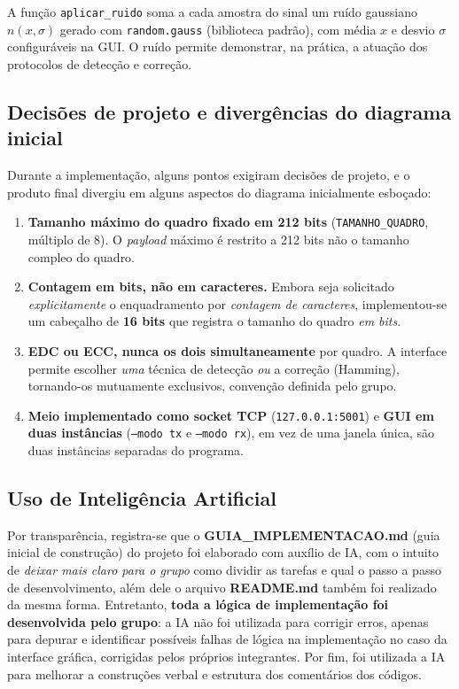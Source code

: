 \documentclass[a4paper, 11pt]{article}
\begin{document}
A função \texttt{aplicar\_ruido} soma a cada amostra do sinal um ruído gaussiano $n(x,\sigma)$
gerado com \texttt{random.gauss} (biblioteca padrão), com média $x$ e desvio $\sigma$
configuráveis na GUI. O ruído permite demonstrar, na prática, a atuação dos protocolos de
detecção e correção.

\subsection{Decisões de projeto e divergências do diagrama inicial}
\label{subsec:divergencias}

Durante a implementação, alguns pontos exigiram decisões de projeto, e o
produto final divergiu em alguns aspectos do diagrama inicialmente esboçado:

\begin{enumerate}\itemsep1pt
    \item \textbf{Tamanho máximo do quadro fixado em 212 bits} (\texttt{TAMANHO\_QUADRO},
    múltiplo de 8). O \emph{payload} máximo é restrito a 212 bits não o tamanho compleo do quadro.
    \item \textbf{Contagem em bits, não em caracteres.} Embora seja solicitado
    \emph{explicitamente} o enquadramento por \emph{contagem de caracteres}, implementou-se um
    cabeçalho de \textbf{16 bits} que registra o tamanho do
    quadro \emph{em bits}.
    \item \textbf{EDC ou ECC, nunca os dois simultaneamente} por quadro. A interface permite
    escolher \emph{uma} técnica de detecção \emph{ou} a correção (Hamming), tornando-os
    mutuamente exclusivos, convenção definida pelo grupo.
    \item \textbf{Meio implementado como socket TCP} (\texttt{127.0.0.1:5001}) e \textbf{GUI em
    duas instâncias} (\texttt{--modo tx} e \texttt{--modo rx}), em vez de uma janela única, 
    são duas instâncias separadas do programa.
\end{enumerate}

\subsection{Uso de Inteligência Artificial}

Por transparência, registra-se que o \textbf{GUIA\_IMPLEMENTACAO.md} (guia inicial de construção) do projeto foi
elaborado com auxílio de IA, com o intuito de \emph{deixar mais claro para o grupo} como
dividir as tarefas e qual o passo a passo de desenvolvimento, além dele o arquivo \textbf{README.md} também foi realizado da mesma forma. 
Entretanto, \textbf{toda a lógica de implementação foi desenvolvida pelo grupo}: a IA não foi utilizada para corrigir erros,
apenas para depurar e identificar possíveis falhas de lógica na implementação no caso da interface gráfica, 
corrigidas pelos próprios integrantes. Por fim, foi utilizada a IA para melhorar a construções verbal e estrutura
dos comentários dos códigos.
\end{document}
